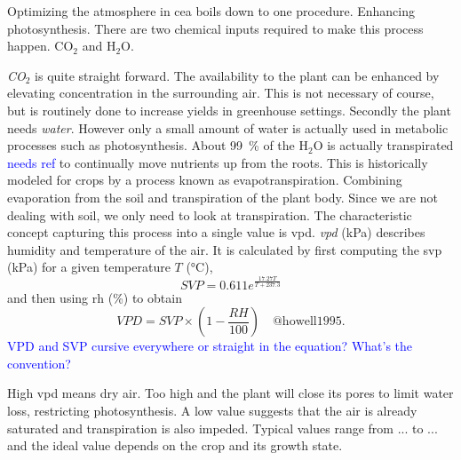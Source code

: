 Optimizing the atmosphere in \ac{cea} boils down to one procedure.
Enhancing photosynthesis.
There are two chemical inputs required to make this process happen.
CO$_2$ and H$_2$O.

\textit{CO$_2$} is quite straight forward.
The availability to the plant can be enhanced by elevating concentration in the surrounding air.
This is not necessary of course, but is routinely done to increase yields in greenhouse settings.
Secondly the plant needs \textit{water}.
However only a small amount of water is actually used in metabolic processes such as photosynthesis.
About \SI{99}{\percent} of the H$_2$O is actually transpirated \textcolor{Blue}{needs ref} to continually move nutrients up from the roots.
This is historically modeled for crops by a process known as evapotranspiration.
Combining evaporation from the soil and transpiration of the plant body.
Since we are not dealing with soil, we only need to look at transpiration.
The characteristic concept capturing this process into a single value is \ac{vpd}.
\textit{\ac{vpd}} (\si{\kPa}) describes humidity and temperature of the air.
It is calculated by first computing the \ac{svp} (\si{\kPa}) for a given temperature $T$ (\si{\degreeCelsius}), 
$$
SVP = 0.611 e^{\frac{17.27 T}{T + 237.3}}
$$
and then using \ac{rh} (\si{\percent}) to obtain
$$
VPD = SVP \times (1-\frac{RH}{100}) \quad \text{@howell1995}.
$$
\textcolor{Blue}{VPD and SVP cursive everywhere or straight in the equation? What's the convention?}

High \ac{vpd} means dry air.
Too high and the plant will close its pores to limit water loss, restricting photosynthesis.
A low value suggests that the air is already saturated and transpiration is also impeded.
Typical values range from ... to ... and the ideal value depends on the crop and its growth state.


